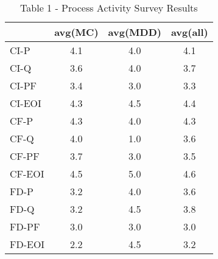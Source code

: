 \documentclass[final_report_innit.tex]{subfiles}
\begin{document}
\begin{table}[h]
\caption{Table 1 - Process Activity Survey Results}
\centering
\begin{tabular}{@{}l|c|c|c|@{}}
\cmidrule(l){2-4}
                             & \multicolumn{1}{l|}{avg(MC)} & \multicolumn{1}{l|}{avg(MDD)} & \multicolumn{1}{l|}{avg(all)} \\ \midrule
\multicolumn{1}{|l|}{CI-P}   & 4.1                          & 4.0                           & 4.1                           \\ \midrule
\multicolumn{1}{|l|}{CI-Q}   & 3.6                          & 4.0                           & 3.7                           \\ \midrule
\multicolumn{1}{|l|}{CI-PF}  & 3.4                          & 3.0                           & 3.3                           \\ \midrule
\multicolumn{1}{|l|}{CI-EOI} & 4.3                          & 4.5                           & 4.4                           \\ \midrule
\multicolumn{1}{|l|}{CF-P}   & 4.3                          & 4.0                           & 4.3                           \\ \midrule
\multicolumn{1}{|l|}{CF-Q}   & 4.0                          & 1.0                           & 3.6                           \\ \midrule
\multicolumn{1}{|l|}{CF-PF}  & 3.7                          & 3.0                           & 3.5                           \\ \midrule
\multicolumn{1}{|l|}{CF-EOI} & 4.5                          & 5.0                           & 4.6                           \\ \midrule
\multicolumn{1}{|l|}{FD-P}   & 3.2                          & 4.0                           & 3.6                           \\ \midrule
\multicolumn{1}{|l|}{FD-Q}   & 3.2                          & 4.5                           & 3.8                           \\ \midrule
\multicolumn{1}{|l|}{FD-PF}  & 3.0                          & 3.0                           & 3.0                           \\ \midrule
\multicolumn{1}{|l|}{FD-EOI} & 2.2                          & 4.5                           & 3.2                           \\ \bottomrule
\end{tabular}
\end{table}
\end{document}
